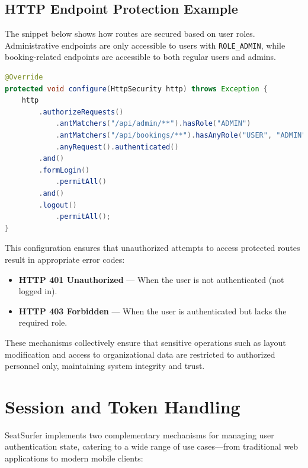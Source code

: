 \documentclass[12pt,a4paper]{report} %
\begin{document}
\subsection*{HTTP Endpoint Protection Example}

The snippet below shows how routes are secured based on user roles. Administrative endpoints are only accessible to users with \verb|ROLE_ADMIN|, while booking-related endpoints are accessible to both regular users and admins.

\begin{lstlisting}[language=Java, caption=Spring Security Configuration]
@Override
protected void configure(HttpSecurity http) throws Exception {
    http
        .authorizeRequests()
            .antMatchers("/api/admin/**").hasRole("ADMIN")
            .antMatchers("/api/bookings/**").hasAnyRole("USER", "ADMIN")
            .anyRequest().authenticated()
        .and()
        .formLogin()
            .permitAll()
        .and()
        .logout()
            .permitAll();
}
\end{lstlisting}

This configuration ensures that unauthorized attempts to access protected routes result in appropriate error codes:
\begin{itemize}
    \item \textbf{HTTP 401 Unauthorized} — When the user is not authenticated (not logged in).
    \item \textbf{HTTP 403 Forbidden} — When the user is authenticated but lacks the required role.
\end{itemize}

These mechanisms collectively ensure that sensitive operations such as layout modification and access to organizational data are restricted to authorized personnel only, maintaining system integrity and trust.

\section{Session and Token Handling}

SeatSurfer implements two complementary mechanisms for managing user authentication state, catering to a wide range of use cases—from traditional web applications to modern mobile clients:
\end{document}
